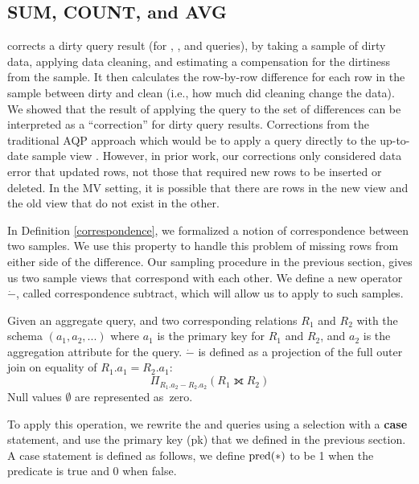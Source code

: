 \subsection{SUM, COUNT, and AVG}
\nsc corrects a dirty query result (for \sumfunc, \countfunc, and \avgfunc queries), by taking a sample of dirty data, applying data cleaning, and estimating a compensation for the dirtiness from the sample.
It then calculates the row-by-row difference for each row in the sample between dirty and clean (i.e., how much did cleaning change the data).
We showed that the result of applying the query to the set of differences can be interpreted as a ``correction'' for dirty query results. 
\reminder{<}Corrections from the traditional AQP approach which would be to apply a query directly to the up-to-date sample view .
However, in prior work, our corrections only considered data error that updated rows, not those that required new rows to be inserted or deleted.
In the MV setting, it is possible that there are rows in the new view and the old view that do not exist in the other.

In Definition \ref{correspondence}, we formalized a notion of correspondence between two samples.
We use this property to handle this problem of missing rows from either side of the difference.
Our sampling procedure in the previous section, gives us two sample views that correspond with each other.
We define a new operator $\dot{-}$, called correspondence subtract, which will allow us to apply \nsc to such samples.
\begin{definition} Given an aggregate query, and two corresponding relations $R_1$ and $R_2$ with the schema $(a_1, a_2, ...)$ where $a_1$ is the primary key for $R_1$ and $R_2$, and $a_2$ is the aggregation attribute for the query. 
$\dot{-}$ is defined as a projection of the full outer join on equality of $R_1.a_1 = R_2.a_1$: \[ \Pi_{R_1.a_2 - R_2.a_2} ( R_1 \fullouterjoin R_2 ) \]
Null values $\emptyset$ are represented as~zero.
\end{definition}
To apply this operation, we rewrite the \sumfunc and \countfunc queries using a selection with a \textbf{case} statement, and use the primary key (pk) that we defined in the previous section.
A case statement is defined as follows, we define $\textrm{pred}(*)$ to be 1 when the predicate is true and 0 when false.

